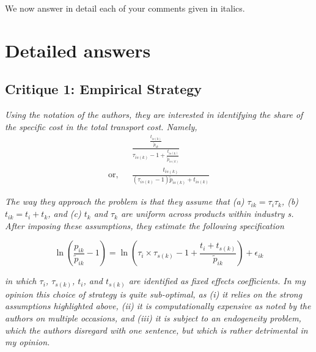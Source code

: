 \documentclass[a4paper,11pt]{article}
\begin{document}
We now answer in detail each of your comments given in italics.

\section{Detailed answers \label{sec:detailed_answers}}


\subsection{Critique 1: Empirical Strategy}

\textit{Using the notation of the authors, they are interested
in identifying the share of the specific cost in the total transport cost. Namely,}
\begin{eqnarray*}
&& \frac{\frac{t_{is(k)}}{\tilde{p}_{ik}}}{\tau_{is(k)}-1 + \frac{t_{is(k)}}{\tilde{p}_{is(k)}}} \\
\text{or,} &&\frac{t_{is(k)}}{(\tau_{is(k)}-1)\tilde{p}_{is(k)} + t_{is(k)}}
\end{eqnarray*}

\textit{The way they approach the problem is that they assume that (a) $\tau_{ik} = \tau_i\tau_{k}$,
(b) $t_{ik} = t_i +t_k$, and (c) $t_k$ and $\tau_k$ are uniform across products within industry
s. After imposing these assumptions, they estimate the following specification}

\begin{equation}
\ln\left(\frac{p_{ik}}{\widetilde{p}_{ik}}-1 \right)= \ln \left(\tau_{i} \times \tau_{s(k)} -1+\frac{t_{i} + t_{s(k)}}{\widetilde{p}_{ik}} \right) + \epsilon_{ik} \label{eq:equation0}
\end{equation}

\textit{in which $\tau_i$, $\tau_{s(k)}$, $t_i$, and $t_{s(k)}$ are identified as fixed effects coefficients.
In my opinion this choice of strategy is quite sub-optimal, as (i) it relies on
the strong assumptions highlighted above, (ii) it is computationally expensive
as noted by the authors on multiple occasions, and (iii) it is subject to an
endogeneity problem, which the authors disregard with one sentence, but which
is rather detrimental in my opinion.}
\end{document}
